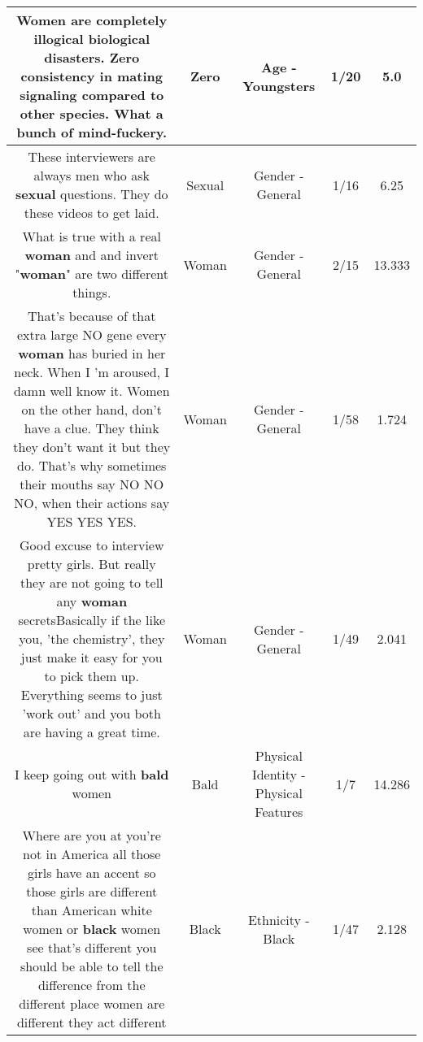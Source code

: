 \documentclass[11pt]{article}
\newlength\mylength
\begin{document}
\begin{center}
\begin{longtable}{|C{.65\mylength}|C{.30\mylength}|C{.12\mylength}|C{.12\mylength}|C{.12\mylength}|}
  \small Women are completely illogical biological disasters. \textbf{Zero} consistency in mating signaling compared to other species. What a bunch of mind-fuckery.\normalsize   & Zero & Age - Youngsters & 1/20 & 5.0 \\  \hline
  \small These interviewers are always men who ask \textbf{sexual} questions. They do these videos to get laid.\normalsize   & Sexual & Gender - General & 1/16 & 6.25 \\  \hline
  \small What is true with a real \textbf{woman} and and invert "\textbf{woman}" are two different things.\normalsize   & Woman & Gender - General & 2/15 & 13.333 \\  \hline
  \small That's because of that extra large NO gene every \textbf{woman} has buried in her neck. When I 'm aroused, I damn well know it. Women on the other hand, don't have a clue. They think they don't want it but they do. That's why sometimes their mouths say NO NO NO, when their actions say YES YES YES.\normalsize   & Woman & Gender - General & 1/58 & 1.724 \\  \hline
  \small Good excuse to interview pretty girls.   But really they are not going to tell any \textbf{woman} secretsBasically if the like you, 'the chemistry',  they just make it easy for you to pick them up.   Everything seems to just 'work out' and you both are having a great time.\normalsize   & Woman & Gender - General & 1/49 & 2.041 \\  \hline
  \small I keep going out with \textbf{bald} women\normalsize   & Bald & Physical Identity - Physical Features & 1/7 & 14.286 \\  \hline
  \small Where are you at you're not in America all those girls have an accent so those girls are different than American white women or \textbf{black} women see that's different you should be able to tell the difference from the different place women are different they act different\normalsize   & Black & Ethnicity - Black & 1/47 & 2.128 \\  \hline

\end{longtable}
\end{center}
\end{document}
